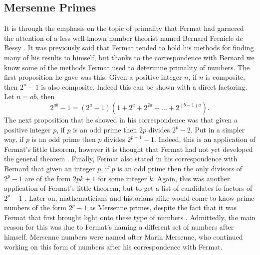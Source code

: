 \documentclass[11pt]{article}
\begin{document}
\subsection*{Mersenne Primes}
It is through the emphasis on the topic of primality that Fermat had garnered the
attention of a less well-known number theorist named
Bernard Frenicle de Bessy \cite{Mahoney}.
It was previously said that Fermat tended to hold his methods for finding many
of his results to himself, but thanks to the correspondence with Bernard we
know some of the methods Fermat used to determine primality of numbers.
The first proposition he gave was this.
Given a positive integer $n$, if $n$ is composite, then $2^n - 1$ is also 
composite.
Indeed this can be shown with a direct factoring.
Let $n = ab$, then
\[2^{ab} - 1 = (2^a - 1)(1 + 2^a + 2^{2a} + \dots +2^{(b-1)a} ). \]
The next proposition that he showed in his correspondence was that given a 
positive integer $p$, if $p$ is an odd prime then $2p$ divides $2^p-2$.
Put in a simpler way, if $p$ is an odd prime then $p$ divides $2^{p-1} - 1$.
Indeed, this is an application of Fermat's little theorem, however it is thought
that Fermat had not yet developed the general theorem \cite{Ball, Mahoney}.
Finally, Fermat also stated in his correspondence with Bernard that given an
integer $p$, if $p$ is an odd prime then the only divisors of $2^p -1$ are of
the form $2pk +1$ for some integer $k$.
Again, this was another application of Fermat's little theorem, but to get a list
of candidates fo factors of $2^p-1$ \cite{MersennePrime}.
Later on, mathematicians and historians alike would come to know prime numbers
of the form $2^p -1$ as Mersenne primes, despite the fact that it was Fermat
that first brought light onto these type of numbers \cite{Mahoney}.
Admittedly, the main reason for this was due to Fermat's naming a different set
of numbers after himself.
Mersenne numbers were named after Marin Mersenne, who continued working on
this form of numbers after his correspondence with Fermat.
\end{document}
